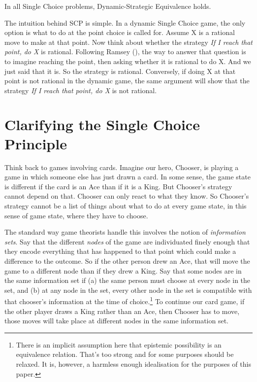 \documentclass[
  10pt,
  letterpaper,
  DIV=11,
  numbers=noendperiod,
  twoside]{scrartcl}
\providecommand{\tightlist}{%
  \setlength{\itemsep}{0pt}\setlength{\parskip}{0pt}}\usepackage{longtable,booktabs,array}
\begin{document}
\begin{description}
\tightlist
\item[Single Choice Principle (SCP)]
In all Single Choice problems, Dynamic-Strategic Equivalence holds.
\end{description}

The intuition behind SCP is simple. In a dynamic Single Choice game, the
only option is what to do at the point choice is called for. Assume X is
a rational move to make at that point. Now think about whether the
strategy \emph{If I reach that point, do X} is rational. Following
Ramsey (), the way to
answer that question is to imagine reaching the point, then asking
whether it is rational to do X. And we just said that it is. So the
strategy is rational. Conversely, if doing X at that point is not
rational in the dynamic game, the same argument will show that the
strategy \emph{If I reach that point, do X} is not rational.

\section{Clarifying the Single Choice Principle}\label{sec-scp-clarify}

Think back to games involving cards. Imagine our hero, Chooser, is
playing a game in which someone else has just drawn a card. In some
sense, the game state is different if the card is an Ace than if it is a
King. But Chooser's strategy cannot depend on that. Chooser can only
react to what they know. So Chooser's strategy cannot be a list of
things about what to do at every game state, in this sense of game
state, where they have to choose.

The standard way game theorists handle this involves the notion of
\emph{information sets}. Say that the different \emph{nodes} of the game
are individuated finely enough that they encode everything that has
happened to that point which could make a difference to the outcome. So
if the other person drew an Ace, that will move the game to a different
node than if they drew a King. Say that some nodes are in the same
information set if (a) the same person must choose at every node in the
set, and (b) at any node in the set, every other node in the set is
compatible with that chooser's information at the time of
choice.\footnote{There is an implicit assumption here that epistemic
  possibility is an equivalence relation. That's too strong and for some
  purposes should be relaxed. It is, however, a harmless enough
  idealisation for the purposes of this paper.} To continue our card
game, if the other player draws a King rather than an Ace, then Chooser
has to move, those moves will take place at different nodes in the same
information set.
\end{document}
